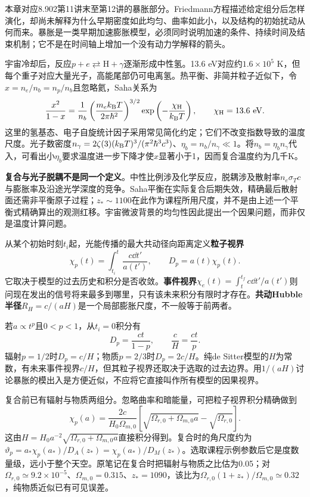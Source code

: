 本章对应8.902第11讲末至第12讲的暴胀部分。Friedmann方程描述给定组分后怎样演化，却尚未解释为什么早期密度如此均匀、曲率如此小，以及结构的初始扰动从何而来。暴胀是一类早期加速膨胀模型，必须同时说明加速的条件、持续时间及结束机制；它不是在时间轴上增加一个没有动力学解释的箭头。

宇宙冷却后，反应$p+e\rightleftarrows\mathrm H+\gamma$逐渐形成中性氢。13.6 eV对应约$1.6\times10^5$ K，但每个重子对应大量光子，高能尾部仍可电离氢。热平衡、非简并粒子近似下，令$x=n_e/n_b=n_p/n_b$且忽略氦，Saha关系为
\[
 \frac{x^2}{1-x}=\frac1{n_b}\left(\frac{m_e\kb T}{2\pi\hbar^2}\right)^{3/2}
 \exp\left(-\frac{\chi_{\rm H}}{\kb T}\right),\qquad\chi_{\rm H}=13.6\ \mathrm{eV}.
\]
这里的氢基态、电子自旋统计因子采用常见简化约定；它们不改变指数导致的温度尺度。光子数密度$n_\gamma=2\zeta(3)(k_{\mathrm B} T)^3/(\pi^2\hbar^3c^3)$、$\eta_b=n_b/n_\gamma\ll1$。将$n_b=\eta_b n_\gamma$代入，可看出小$\eta_b$要求温度进一步下降才使$x$显著小于1，因而复合温度约为几千K。

\textbf{复合与光子脱耦不是同一个定义}。中性比例涉及化学反应，脱耦涉及散射率$n_e\sigma_Tc$与膨胀率及沿途光学深度的竞争。Saha平衡在实际复合后期失效，精确最后散射面还需非平衡原子过程；$z_*\sim1100$在此作为课程所用尺度，并不是由上述一个平衡式精确算出的观测红移。宇宙微波背景的均匀性因此提出一个因果问题，而非仅是温度计算问题。

从某个初始时刻$t_i$起，光能传播的最大共动径向距离定义\textbf{粒子视界}
\[
 \chi_p(t)=\int_{t_i}^t\frac{c\dd t'}{a(t')},\qquad D_p=a(t)\chi_p(t).
\]
它取决于模型的过去历史和积分是否收敛。\textbf{事件视界}$\chi_e(t)=\int_t^{t_f}c\dd t'/a(t')$则问现在发出的信号将来最多到哪里，只有该未来积分有限时才存在。\textbf{共动Hubble半径}$R_H=c/(aH)$是一个局部膨胀尺度，不一般等于前两者。

若$a\propto t^p$且$0<p<1$，从$t_i=0$积分有
\[
 D_p=\frac{ct}{1-p},\qquad\frac cH=\frac{ct}{p}.
\]
辐射$p=1/2$时$D_p=c/H$；物质$p=2/3$时$D_p=2c/H$。纯de Sitter模型的$H$为常数，有未来事件视界$c/H$，但其粒子视界还取决于选取的过去边界。用$1/(aH)$讨论暴胀的模出入是方便近似，不应将它直接叫作所有模型的因果视界。

复合前已有辐射与物质两组分。忽略曲率和暗能量，可把粒子视界积分精确做到
\[
 \chi_p(a)=\frac{2c}{H_0\Omega_{m,0}}
 \left[\sqrt{\Omega_{r,0}+\Omega_{m,0}a}-\sqrt{\Omega_{r,0}}\right].
\]
这由$H=H_0a^{-2}\sqrt{\Omega_{r,0}+\Omega_{m,0}a}$直接积分得到。复合时的角尺度约为$\vartheta_p=a_*\chi_p(a_*)/D_A(z_*)=\chi_p(a_*)/D_M(z_*)$。选取课程示例参数后它是度数量级，远小于整个天空。原笔记在复合时把辐射与物质之比估为0.05；对$\Omega_{r,0}\simeq9.2\times10^{-5}$、$\Omega_{m,0}=0.315$、$z_*=1090$，该比为$\Omega_{r,0}(1+z_*)/\Omega_{m,0}\simeq0.32$，纯物质近似已有可见误差。

